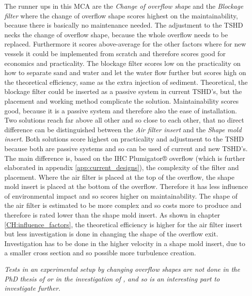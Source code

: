 The runner ups in this MCA are the \textit{Change of overflow shape} and the \textit{Blockage filter} where the change of overflow shape scores highest on the maintainability, because there is basically no maintenance needed. The adjustment to the TSHD necks the change of overflow shape, because the whole overflow needs to be replaced. Furthermore it scores above-average for the other factors where for new vessels it could be implemented from scratch and therefore scores good for economics and practicality. The blockage filter scores low on the practicality on how to separate sand and water and let the water flow further but scores high on the theoretical efficiency, same as the extra injection of sediment. Theoretical, the blockage filter could be inserted as a passive system in current TSHD's, but the placement and working method complicate the solution. Maintainability scores good, because it is a passive system and therefore also the ease of installation.\newline
Two solutions reach far above all other and so close to each other, that no direct difference can be distinguished between the \textit{Air filter insert} and the \textit{Shape mold insert}. Both solutions score highest on practicality and adjustment to the TSHD because both are passive systems and so can be used of current and new TSHD's. The main difference is, based on the IHC Plumigator® overflow (which is further elaborated in appendix \ref{app:current_designs}), the complexity of the filter and placement. Where the air filter is placed at the top of the overflow, the shape mold insert is placed at the bottom of the overflow. Therefore it has less influence of environmental impact and so scores higher on maintainability. The shape of the air filter is estimated to be more complex and so costs more to produce and therefore is rated lower than the shape mold insert. As shown in chapter \ref{CH:influence_factors}, the theoretical efficiency is higher for the air filter insert but less investigation is done in changing the shape of the overflow exit. Investigation has to be done in the higher velocity in a shape mold insert, due to a smaller cross section and so possible more turbulence creation. \newline

\noindent \textit{Tests in an experimental setup by changing overflow shapes are not done in the PhD thesis of \cite{Decrop} or in the investigation of \cite{Wang}, and so is an interesting part to investigate further.} 



